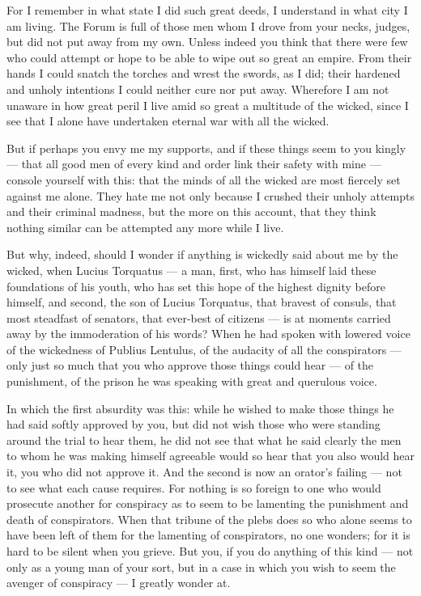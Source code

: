  For I remember in what state I did such great deeds, I understand in what city I am living. The Forum is full of those men whom I drove from your necks, judges, but did not put away from my own. Unless indeed you think that there were few who could attempt or hope to be able to wipe out so great an empire. From their hands I could snatch the torches and wrest the swords, as I did; their hardened and unholy intentions I could neither cure nor put away. Wherefore I am not unaware in how great peril I live amid so great a multitude of the wicked, since I see that I alone have undertaken eternal war with all the wicked.

 But if perhaps you envy me my supports, and if these things seem to you kingly --- that all good men of every kind and order link their safety with mine --- console yourself with this: that the minds of all the wicked are most fiercely set against me alone. They hate me not only because I crushed their unholy attempts and their criminal madness, but the more on this account, that they think nothing similar can be attempted any more while I live.

 But why, indeed, should I wonder if anything is wickedly said about me by the wicked, when Lucius Torquatus --- a man, first, who has himself laid these foundations of his youth, who has set this hope of the highest dignity before himself, and second, the son of Lucius Torquatus, that bravest of consuls, that most steadfast of senators, that ever-best of citizens --- is at moments carried away by the immoderation of his words? When he had spoken with lowered voice of the wickedness of Publius Lentulus, of the audacity of all the conspirators --- only just so much that you who approve those things could hear --- of the punishment, of the prison he was speaking with great and querulous voice.

 In which the first absurdity was this: while he wished to make those things he had said softly approved by you, but did not wish those who were standing around the trial to hear them, he did not see that what he said clearly the men to whom he was making himself agreeable would so hear that you also would hear it, you who did not approve it. And the second is now an orator's failing --- not to see what each cause requires. For nothing is so foreign to one who would prosecute another for conspiracy as to seem to be lamenting the punishment and death of conspirators. When that tribune of the plebs does so who alone seems to have been left of them for the lamenting of conspirators, no one wonders; for it is hard to be silent when you grieve. But you, if you do anything of this kind --- not only as a young man of your sort, but in a case in which you wish to seem the avenger of conspiracy --- I greatly wonder at.

